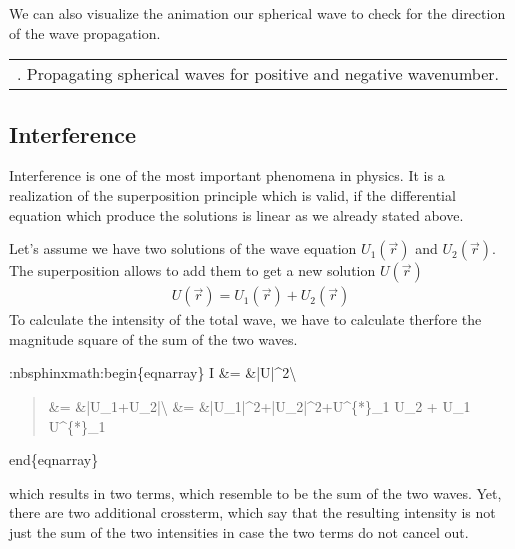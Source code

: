 \documentclass[letterpaper,10pt,english]{sphinxmanual}
\begin{document}
We can also visualize the animation our spherical wave to check for the direction of the wave propagation.


\begin{savenotes}\sphinxattablestart
\centering
\begin{tabulary}{\linewidth}[t]{|T|}
\hline
\sphinxstyletheadfamily 
{} 
\\
\hline
{} . Propagating spherical waves for positive and negative wavenumber.
\\
\hline
\end{tabulary}
\par
\sphinxattableend\end{savenotes}


\subsection{Interference}
\label{\detokenize{notebooks/L8/Wave Optics:Interference}}
Interference is one of the most important phenomena in physics. It is a realization of the superposition principle which is valid, if the differential equation which produce the solutions is linear as we already stated above.

Let’s assume we have two solutions of the wave equation \(U_1(\vec{r})\) and \(U_2(\vec{r})\). The superposition allows to add them to get a new solution \(U(\vec{r})\)
\begin{equation*}
\begin{split}U(\vec{r})=U_{1}(\vec{r})+U_{2}(\vec{r})\end{split}
\end{equation*}
To calculate the intensity of the total wave, we have to calculate therfore the magnitude square of the sum of the two waves.

:nbsphinx\sphinxhyphen{}math:{\color{red}\bfseries{}\textasciigrave{}}begin\{eqnarray\}
I \&= \&|U|\textasciicircum{}2\textbackslash{}
\begin{quote}

\&= \&|U\_1+U\_2|\textbackslash{}
\&= \&|U\_1|\textasciicircum{}2+|U\_2|\textasciicircum{}2+U\textasciicircum{}\{*\}\_1 U\_2 + U\_1 U\textasciicircum{}\{*\}\_1
\end{quote}

end\{eqnarray\}\textasciigrave{}

which results in two terms, which resemble to be the sum of the two waves. Yet, there are two additional cross\sphinxhyphen{}term, which say that the resulting intensity is not just the sum of the two intensities in case the two terms do not cancel out.
\end{document}
